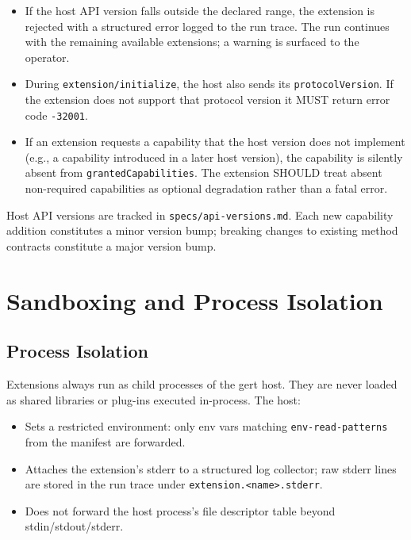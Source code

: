 \begin{itemize}
  \item If the host API version falls outside the declared range, the extension
        is rejected with a structured error logged to the run trace.  The run
        continues with the remaining available extensions; a warning is surfaced
        to the operator.
  \item During \texttt{extension/initialize}, the host also sends its
        \texttt{protocolVersion}.  If the extension does not support that
        protocol version it MUST return error code \texttt{-32001}.
  \item If an extension requests a capability that the host version does not
        implement (e.g., a capability introduced in a later host version), the
        capability is silently absent from \texttt{grantedCapabilities}.  The
        extension SHOULD treat absent non-required capabilities as optional
        degradation rather than a fatal error.
\end{itemize}

Host API versions are tracked in \texttt{specs/api-versions.md}.  Each new
capability addition constitutes a minor version bump; breaking changes to
existing method contracts constitute a major version bump.

\section{Sandboxing and Process Isolation}
\label{sec:ext-sandbox}

\subsection{Process Isolation}

Extensions always run as child processes of the gert host.  They are never
loaded as shared libraries or plug-ins executed in-process.  The host:

\begin{itemize}
  \item Sets a restricted environment: only env vars matching
        \texttt{env-read-patterns} from the manifest are forwarded.
  \item Attaches the extension's stderr to a structured log collector; raw
        stderr lines are stored in the run trace under
        \texttt{extension.<name>.stderr}.
  \item Does not forward the host process's file descriptor table beyond
        stdin/stdout/stderr.
\end{itemize}


